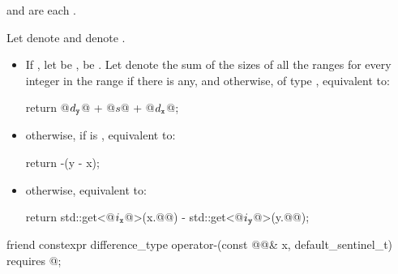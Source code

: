 \begin{itemdescr}
\pnum
\expects
{} and
 are each .

\pnum
\effects
Let
 denote  and
 denote .

\begin{itemize}
\item
If , let
 be
,
 be
.
Let  denote the sum of the sizes of all the ranges
for every integer  in the range
if there is any, and
 otherwise,
of type ,
equivalent to:
\begin{codeblock}
return @$d_\tcode{y}$@ + @$s$@ + @$d_\tcode{x}$@;
\end{codeblock}

\item
otherwise, if  is ,
equivalent to:
\begin{codeblock}
return -(y - x);
\end{codeblock}

\item
otherwise, equivalent to:
\begin{codeblock}
return std::get<@$i_\tcode{x}$@>(x.@@) - std::get<@$i_\tcode{y}$@>(y.@@);
\end{codeblock}
\end{itemize}
\end{itemdescr}

%
\begin{itemdecl}
friend constexpr difference_type operator-(const @@& x, default_sentinel_t)
  requires @\seebelow@;
\end{itemdecl}


